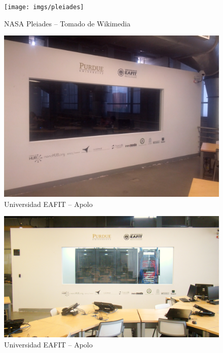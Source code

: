 \begin{frame}
 \begin{figure}[ht]
        \centering
        \texttt{[image: imgs/pleiades]}
        \caption{NASA Pleiades -- \small{Tomado de Wikimedia}}
      \end{figure}
\end{frame}

\begin{frame}
 \begin{figure}[ht]
        \centering
        \includegraphics[scale=0.1]{imgs/apolo}
        \caption{Universidad EAFIT -- Apolo}
 \end{figure}
\end{frame}

\begin{frame}
 \begin{figure}[ht]
        \centering
        \includegraphics[scale=0.15]{imgs/apolo1}
        \caption{Universidad EAFIT -- Apolo}
 \end{figure}
\end{frame}

